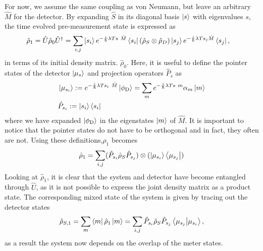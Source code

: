 \documentclass{article}
\begin{document}
For now, we assume the same coupling as von Neumann, but leave an arbitrary $\hat{M}$ for the detector. By expanding
$\hat{S}$ in its diagonal basis $\ket{s}$ with eigenvalues $s$, the time evolved pre-measurement state is expressed as
\begin{align*}
  \hat{\rho}_1 = \hat{U}\hat{\rho}_0 \hat{U}^\dagger & =  \sum_{i,j} \ket{s_i} e^{-\frac{i}{\hbar} \lambda T s \hat{M} } \bra{s_i}
  \left (  \hat{\rho}_S \otimes \hat{\rho}_D \right ) \ket{s_j} e^{-\frac{i}{\hbar} \lambda 
    T s_j\hat{M} } \bra{s_j},
\end{align*}
in terms of its initial density matrix. 
$\hat{\rho}_0$.
Here, it is useful to define the pointer states of the detector 
$\ket{\mu_s}$ and projection operators $\hat{P}_s$ as
\begin{align}
    & \ket{\mu_{s_i}} := e^{-\frac{i}{\hbar} \lambda T s_i \hat{M} } \ket{\phi_{\rm D}} = \sum_m  e^{-\frac{i}{\hbar} \lambda T s m } 
    \alpha_m \ket{m} \\
    & \hat{P}_{s_i} := \ket{s_i} \bra{s_i}
\end{align}
where we have expanded $\ket{\phi_{\rm D}}$ in the eigenstates $\ket{m}$ of $\hat{M}$. It is important to notice that the pointer states do not have to
be orthogonal and in fact, they often are not. Using these definitions,$\rho_1$ becomes
\begin{align}\label{eq:pre_measurement}
    \hat{\rho}_1 = \sum_{i,j} ( \hat{P}_{s_i} \hat{\rho}_S \hat{P}_{s_j} ) \otimes 
    (\ket{\mu_{s_i}}\bra{\mu_{{s_j}}})
\end{align}
Looking at $\hat{\rho}_1$, it is clear that the system and detector have become entangled through $\hat{U}$, as
it is not possible to express the joint density matrix as a product state. The corresponding mixed state of the system
is given by tracing out the detector states
\begin{align}\label{eq:pre_measurement_system_full}
    \hat{\rho}_{S,1} =  \sum_m \bra{m}\hat{\rho}_{1}\ket{m} = \sum_{i,j} \hat{P}_{s_i} \hat{\rho}_{S} \hat{P}_{s_j}
    \bra{\mu_{s_j}} \ket{\mu_{s_i}},
\end{align}
as a result the system now depends on the overlap of the meter states. 
\end{document}
